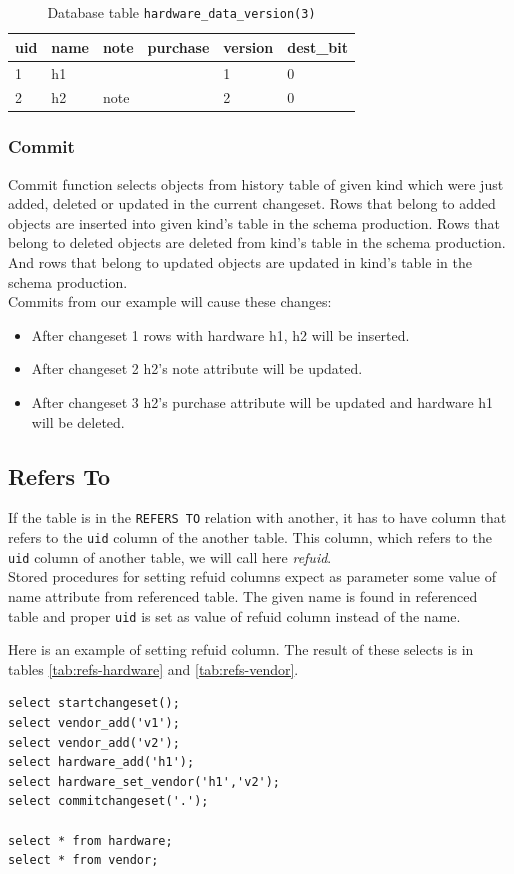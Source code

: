 \documentclass[deska]{subfiles}
\begin{document}
\label{tab:select-hardware-v3}
\begin{longtable}{ l | l | l | l | l | l }
    \caption{Database table {\tt hardware\_data\_version(3)}} \\
    uid & name & note & purchase & version & dest\_bit\\
    \hline
    \endhead
    1 & h1 &  &  & 1 & 0\\
    2 & h2 & note &  & 2 & 0\\
    \hline
\end{longtable}

\subsubsection{Commit}
Commit function selects objects from history table of given kind which were just added, deleted or updated in the current changeset. Rows that belong to added objects are inserted into given kind's table in the schema production. Rows that belong to deleted objects are deleted from kind's table in the schema production. And rows that belong to updated objects are updated in kind's table in the schema production.\\
Commits from our example will cause these changes:
\begin{itemize}
    \item After changeset 1 rows with hardware h1, h2 will be inserted.
    \item After changeset 2 h2's note attribute will be updated.
    \item After changeset 3 h2's purchase attribute will be updated and hardware h1 will be deleted.
\end{itemize}

\subsection{Refers To}
\label{sec:db-refs-to}
If the table is in the {\tt REFERS TO} relation with another, it has to have column that refers to the {\tt uid} column of the another table. This column, which refers to the {\tt uid} column of another table, we will call here {\em refuid}.\\
Stored procedures for setting refuid columns expect as parameter some value of name attribute from referenced table. The given name is found in referenced table and proper {\tt uid} is set as value of refuid column instead of the name.

Here is an example of setting refuid column. The result of these selects is in tables \ref{tab:refs-hardware} and  \ref{tab:refs-vendor}.
\begin{verbatim}
select startchangeset();
select vendor_add('v1');
select vendor_add('v2');
select hardware_add('h1');
select hardware_set_vendor('h1','v2');
select commitchangeset('.');

select * from hardware;
select * from vendor;
\end{verbatim}
\end{document}
